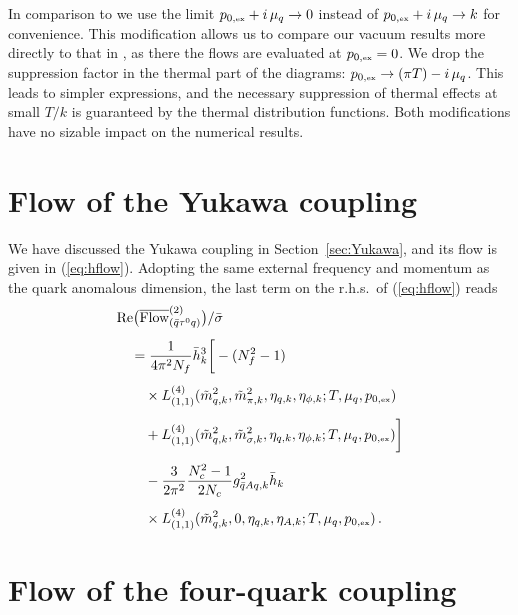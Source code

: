 \documentclass[%
reprint,
superscriptaddress,
showpacs,preprintnumbers,
 amsmath,amssymb,
 aps,
prd,
]{revtex4-1}
\def\eq#1{(\ref{#1})}
\def\sec#1{Section~\ref{#1}}
\begin{document}
In comparison to \cite{Fu:2015naa} we use the limit
$p_{0,\text{\tiny{ex}}}+i\,\mu_q\to 0$ instead of
$p_{0,\text{\tiny{ex}}}+i\,\mu_q \to k$ for convenience. This
modification allows us to compare our vacuum results more directly to
that in \cite{Braun:2014ata}, as there the flows are evaluated at
$p_{0,\text{\tiny{ex}}}=0$. We drop the suppression factor in the
thermal part of the diagrams:
$p_{0,\text{\tiny{ex}}} \to (\pi T) - i\,\mu_q$. This leads to simpler
expressions, and the necessary suppression of thermal effects at small
$T/k$ is guaranteed by the thermal distribution functions. Both
modifications have no sizable impact on the numerical results.



\section{Flow of the Yukawa coupling}
\label{app:dth}

We have discussed the Yukawa coupling in \sec{sec:Yukawa}, and its
flow is given in \eq{eq:hflow}.  Adopting the same external frequency
and momentum as the quark anomalous dimension, the last term on the
r.h.s.\ of \eq{eq:hflow} reads
%
\begin{align}
  &\mathrm{Re}\big(\overline{\textrm{Flow}}^{(2)}_{(\bar q \tau^0 q)}\big)/
    \bar \sigma\nonumber\\[1ex]
  &\quad=\frac{1}{4\pi^2 N_f}\bar{h}_k^3
    \bigg[-(N_{f}^{2}-1)\nonumber \\[1ex] 
  &\qquad\times L_{(1,1)}^{(4)}(
    \tilde{m}_{q,k}^{2},\tilde{m}_{\pi,k}^{2},
    \eta_{q,k},\eta_{\phi,k};T,\mu_q,
    p_{0,\text{\tiny{ex}}})\nonumber\\[1ex]
  &\qquad+L_{(1,1)}^{(4)}(\tilde{m}_{q,k}^{2},\tilde{m}_{\sigma,k}^{2},
    \eta_{q,k},\eta_{\phi,k};T,\mu_q,p_{0,\text{\tiny{ex}}})
    \bigg]\nonumber\\[1ex]
  &\qquad-\frac{3}{2\pi^2}\frac{N_c^2-1}{2N_c}
    g_{\bar q A q, k}^{2}\bar{h}_k
    \nonumber \\[1ex]  
  &\qquad\times L_{(1,1)}^{(4)}(\tilde{m}_{q,k}^{2},0,
    \eta_{q,k},\eta_{A,k};T,
    \mu_q,p_{0,\text{\tiny{ex}}})\,.\label{eq:hexp}
\end{align}
%
\section{Flow of the four-quark coupling}
\label{app:dtlambda}
\end{document}
